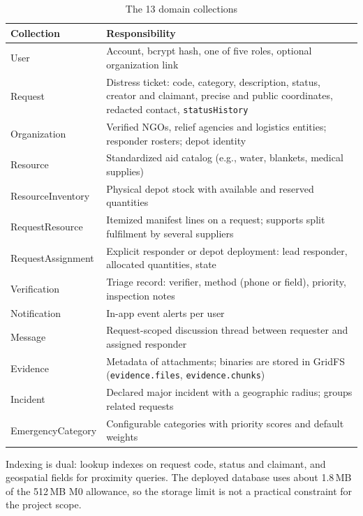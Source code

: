 \documentclass[11pt,a4paper]{article}
\newcommand{\tc}[1]{\texttt{\small #1}}
\begin{document}
\renewcommand{\arraystretch}{1.2}
\begin{table}[H]
\centering
\begin{tabularx}{\textwidth}{@{}p{1.55in}X@{}}
\toprule
\textbf{Collection} & \textbf{Responsibility}\\
\midrule
User & Account, bcrypt hash, one of five roles, optional organization link\\
Request & Distress ticket: code, category, description, status, creator and claimant, precise and public coordinates, redacted contact, \tc{statusHistory}\\
Organization & Verified NGOs, relief agencies and logistics entities; responder rosters; depot identity\\
Resource & Standardized aid catalog (e.g., water, blankets, medical supplies)\\
ResourceInventory & Physical depot stock with available and reserved quantities\\
RequestResource & Itemized manifest lines on a request; supports split fulfilment by several suppliers\\
RequestAssignment & Explicit responder or depot deployment: lead responder, allocated quantities, state\\
Verification & Triage record: verifier, method (phone or field), priority, inspection notes\\
Notification & In-app event alerts per user\\
Message & Request-scoped discussion thread between requester and assigned responder\\
Evidence & Metadata of attachments; binaries are stored in GridFS (\tc{evidence.files}, \tc{evidence.chunks})\\
Incident & Declared major incident with a geographic radius; groups related requests\\
EmergencyCategory & Configurable categories with priority scores and default weights\\
\bottomrule
\end{tabularx}
\caption{The 13 domain collections}\label{tab:collections}
\end{table}
\renewcommand{\arraystretch}{1}

Indexing is dual: lookup indexes on request code, status and claimant, and geospatial fields for proximity queries. The deployed database uses about 1.8\,MB of the 512\,MB M0 allowance, so the storage limit is not a practical constraint for the project scope.

\newpage
\end{document}
